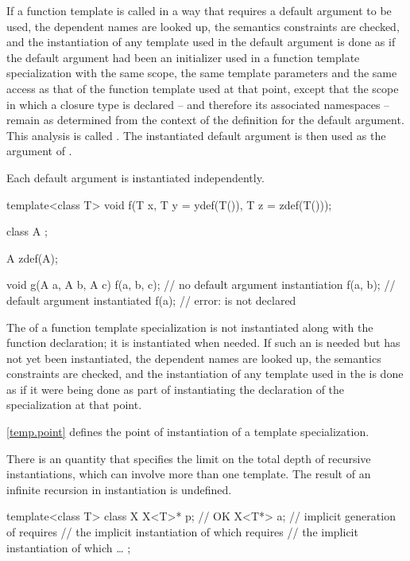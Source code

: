 \pnum
If a function template
is called in a way that requires a default argument to be used,
the dependent names are looked up, the semantics constraints are checked,
and the instantiation of any template used in the default argument
is done as if the default argument had been
an initializer used in a function template specialization with the same scope,
the same template parameters and the same access as that of the function template
used at that point, except that the scope in which a closure type is
declared -- and therefore its associated namespaces --
remain as determined from the context of the definition for the default
argument.
This analysis is called
.
The instantiated default argument is then used as the argument of
.

\pnum
Each default argument is instantiated independently.
\begin{example}
\begin{codeblock}
template<class T> void f(T x, T y = ydef(T()), T z = zdef(T()));

class  A { };

A zdef(A);

void g(A a, A b, A c) {
  f(a, b, c);       // no default argument instantiation
  f(a, b);          // default argument  instantiated
  f(a);             // error:  is not declared
}
\end{codeblock}
\end{example}

\pnum
The  of a function template specialization
is not instantiated along with the function declaration; it is instantiated
when needed. If such an
 is needed but has not yet been
instantiated, the dependent names are looked up, the semantics constraints are
checked, and the instantiation of any template used in the
 is done as if it were being done as part
of instantiating the declaration of the specialization at that point.

\pnum
\begin{note}
\ref{temp.point} defines the point of instantiation of a template specialization.
\end{note}

\pnum
There is an  quantity
that specifies the limit on the total depth of recursive instantiations,
which can involve more than one template.
The result of an infinite recursion in instantiation is undefined.
\begin{example}
\begin{codeblock}
template<class T> class X {
  X<T>* p;          // OK
  X<T*> a;          // implicit generation of  requires
                    // the implicit instantiation of  which requires
                    // the implicit instantiation of  which \ldots
};
\end{codeblock}
\end{example}

